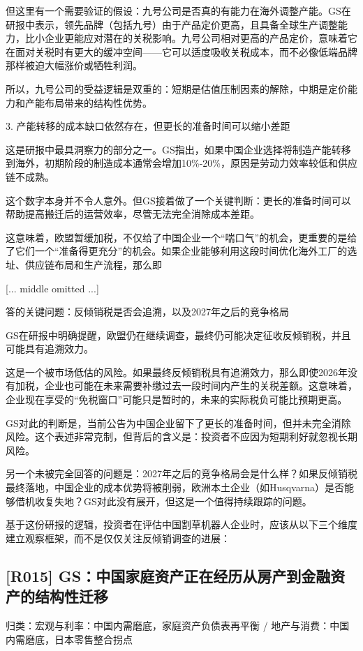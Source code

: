 \documentclass[11pt]{ctexart}
\begin{document}
但这里有一个需要验证的假设：九号公司是否真的有能力在海外调整产能。GS在研报中表示，领先品牌（包括九号）由于产品定价更高，且具备全球生产调整能力，比小企业更能应对潜在的关税影响。九号公司相对更高的产品定价，意味着它在面对关税时有更大的缓冲空间——它可以适度吸收关税成本，而不必像低端品牌那样被迫大幅涨价或牺牲利润。

所以，九号公司的受益逻辑是双重的：短期是估值压制因素的解除，中期是定价能力和产能布局带来的结构性优势。

3. 产能转移的成本缺口依然存在，但更长的准备时间可以缩小差距

这是研报中最具洞察力的部分之一。GS指出，如果中国企业选择将制造产能转移到海外，初期阶段的制造成本通常会增加10\%-20\%，原因是劳动力效率较低和供应链不成熟。

这个数字本身并不令人意外。但GS接着做了一个关键判断：更长的准备时间可以帮助提高搬迁后的运营效率，尽管无法完全消除成本差距。

这意味着，欧盟暂缓加税，不仅给了中国企业一个“喘口气”的机会，更重要的是给了它们一个“准备得更充分”的机会。如果企业能够利用这段时间优化海外工厂的选址、供应链布局和生产流程，那么即

[... middle omitted ...]

答的关键问题：反倾销税是否会追溯，以及2027年之后的竞争格局

GS在研报中明确提醒，欧盟仍在继续调查，最终仍可能决定征收反倾销税，并且可能具有追溯效力。

这是一个被市场低估的风险。如果最终反倾销税具有追溯效力，那么即使2026年没有加税，企业也可能在未来需要补缴过去一段时间内产生的关税差额。这意味着，企业现在享受的“免税窗口”可能只是暂时的，未来的实际税负可能比预期更高。

GS对此的判断是，当前公告为中国企业留下了更长的准备时间，但并未完全消除风险。这个表述非常克制，但背后的含义是：投资者不应因为短期利好就忽视长期风险。

另一个未被完全回答的问题是：2027年之后的竞争格局会是什么样？如果反倾销税最终落地，中国企业的成本优势将被削弱，欧洲本土企业（如Husqvarna）是否能够借机收复失地？GS对此没有展开，但这是一个值得持续跟踪的问题。

基于这份研报的逻辑，投资者在评估中国割草机器人企业时，应该从以下三个维度建立观察框架，而不是仅仅关注反倾销调查的进展：

\subsection{[R015] GS：中国家庭资产正在经历从房产到金融资产的结构性迁移}
{\small\color{refgray}归类：宏观与利率：中国内需磨底，家庭资产负债表再平衡 / 地产与消费：中国内需磨底，日本零售整合拐点}
\end{document}
